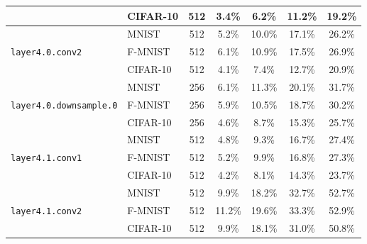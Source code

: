 \documentclass{article}
\theoremstyle{plain}
\theoremstyle{definition}
\theoremstyle{remark}
\begin{document}
\begin{table}[t]
\begin{center}
\begin{small}
\begin{tabular}{llccccc}
& CIFAR-10 & 512 & 3.4\% & 6.2\% & 11.2\% & 19.2\% \\
\hline
\multirow{3}{*}{\texttt{layer4.0.conv2}} 
& MNIST & 512 & 5.2\% & 10.0\% & 17.1\% & 26.2\% \\
& F-MNIST & 512 & 6.1\% & 10.9\% & 17.5\% & 26.9\% \\
& CIFAR-10 & 512 & 4.1\% & 7.4\% & 12.7\% & 20.9\% \\
\hline
\multirow{3}{*}{\texttt{layer4.0.downsample.0}} 
& MNIST & 256 & 6.1\% & 11.3\% & 20.1\% & 31.7\% \\
& F-MNIST & 256 & 5.9\% & 10.5\% & 18.7\% & 30.2\% \\
& CIFAR-10 & 256 & 4.6\% & 8.7\% & 15.3\% & 25.7\% \\
\hline
\multirow{3}{*}{\texttt{layer4.1.conv1}} 
& MNIST & 512 & 4.8\% & 9.3\% & 16.7\% & 27.4\% \\
& F-MNIST & 512 & 5.2\% & 9.9\% & 16.8\% & 27.3\% \\
& CIFAR-10 & 512 & 4.2\% & 8.1\% & 14.3\% & 23.7\% \\
\hline
\multirow{3}{*}{\texttt{layer4.1.conv2}} 
& MNIST & 512 & 9.9\% & 18.2\% & 32.7\% & 52.7\% \\
& F-MNIST & 512 & 11.2\% & 19.6\% & 33.3\% & 52.9\% \\
& CIFAR-10 & 512 & 9.9\% & 18.1\% & 31.0\% & 50.8\% \\
\bottomrule
\end{tabular}
\end{small}
\end{center}
\end{table}
\end{document}
